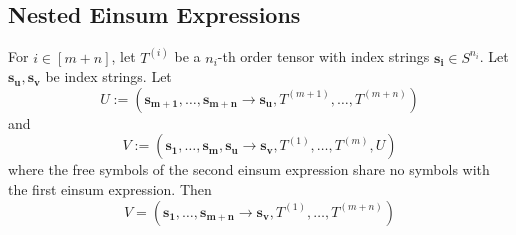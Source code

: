 \subsection{Nested Einsum Expressions}
\begin{theorem}
    For $i \in [m + n]$, let $T^{(i)}$ be a $n_i$-th order tensor with index strings $\bm{s_i} \in S^{n_i}$.
    Let $\bm{s_u}, \bm{s_v}$ be index strings.
    Let
    $$U := (\bm{s_{m + 1}},\dots,\bm{s_{m + n}} \rightarrow \bm{s_u}, T^{(m + 1)},\dots,T^{(m + n)})$$
    and
    $$V := (\bm{s_1},\dots,\bm{s_m}, \bm{s_u} \rightarrow \bm{s_v}, T^{(1)},\dots,T^{(m)}, U)$$
    where the free symbols of the second einsum expression share no symbols with the first einsum expression.
    Then
    $$V = (\bm{s_1}, \dots, \bm{s_{m + n}} \rightarrow \bm{s_v}, T^{(1)}, \dots, T^{(m + n)})$$
\end{theorem}
